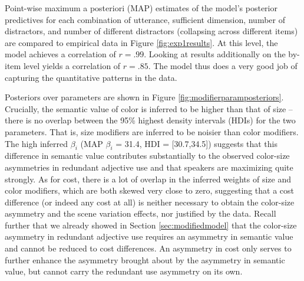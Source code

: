 \documentclass[11pt]{article}
\newcommand{\jd}[1]{\textcolor{Red}{[jd: #1]}}
\newcommand{\figref}[1]{Figure \ref{#1}}
\newcommand{\sectionref}[1]{Section \ref{#1}}
\begin{document}
Point-wise maximum a posteriori (MAP) estimates of the model's posterior predictives for each combination of utterance, sufficient dimension, number of distractors, and number of different distractors (collapsing across different items) are compared to empirical data in \figref{fig:exp1results}. At this level, the model achieves a correlation of $r = .99$. Looking at results additionally on the by-item level yields a correlation of $r = .85$. The model thus does a very good job of capturing the quantitative patterns in the data. %



Posteriors over parameters are shown in \figref{fig:modifierparamposteriors}. Crucially, the semantic value of color is inferred to be higher than that of size -- there is no overlap between the 95\% highest density intervals (HDIs) for the two parameters. That is, size modifiers are inferred to be noisier than color modifiers. The  high inferred $\beta_i$ (MAP $\beta_i$ = 31.4, HDI = [30.7,34.5]) suggests that this difference in semantic value contributes substantially to the observed color-size asymmetries in redundant adjective use and that speakers are maximizing quite strongly. As for cost, there is a lot of overlap in the inferred weights of size and color modifiers, which are both skewed very close to zero, suggesting that a cost difference (or indeed any cost at all) is neither necessary  to obtain the color-size asymmetry and the scene variation effects, nor justified by the data. Recall further that we already showed in \sectionref{sec:modifiedmodel}  that the color-size asymmetry in redundant adjective use requires an asymmetry in semantic value and cannot be reduced to cost differences. An asymmetry in cost only serves to further enhance the asymmetry brought about by the  asymmetry in semantic value, but cannot carry the redundant use asymmetry on its own.
\end{document}

